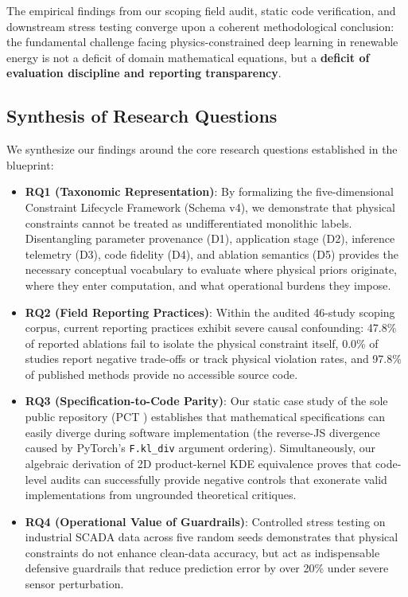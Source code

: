 \documentclass[preprint,3p,times]{elsarticle}
\begin{document}
The empirical findings from our scoping field audit, static code verification, and downstream stress testing converge upon a coherent methodological conclusion: the fundamental challenge facing physics-constrained deep learning in renewable energy is not a deficit of domain mathematical equations, but a \textbf{deficit of evaluation discipline and reporting transparency}.

\subsection{Synthesis of Research Questions}
We synthesize our findings around the core research questions established in the blueprint:
\begin{itemize}[leftmargin=1.5em]
    \item \textbf{RQ1 (Taxonomic Representation)}: By formalizing the five-dimensional Constraint Lifecycle Framework (Schema v4), we demonstrate that physical constraints cannot be treated as undifferentiated monolithic labels. Disentangling parameter provenance (D1), application stage (D2), inference telemetry (D3), code fidelity (D4), and ablation semantics (D5) provides the necessary conceptual vocabulary to evaluate where physical priors originate, where they enter computation, and what operational burdens they impose.
    \item \textbf{RQ2 (Field Reporting Practices)}: Within the audited 46-study scoping corpus, current reporting practices exhibit severe causal confounding: 47.8\% of reported ablations fail to isolate the physical constraint itself, 0.0\% of studies report negative trade-offs or track physical violation rates, and 97.8\% of published methods provide no accessible source code.
    \item \textbf{RQ3 (Specification-to-Code Parity)}: Our static case study of the sole public repository (PCT \cite{pct2026}) establishes that mathematical specifications can easily diverge during software implementation (the reverse-JS divergence caused by PyTorch's \texttt{F.kl\_div} argument ordering). Simultaneously, our algebraic derivation of 2D product-kernel KDE equivalence proves that code-level audits can successfully provide negative controls that exonerate valid implementations from ungrounded theoretical critiques.
    \item \textbf{RQ4 (Operational Value of Guardrails)}: Controlled stress testing on industrial SCADA data across five random seeds demonstrates that physical constraints do not enhance clean-data accuracy, but act as indispensable defensive guardrails that reduce prediction error by over 20\% under severe sensor perturbation.
\end{itemize}
\end{document}
